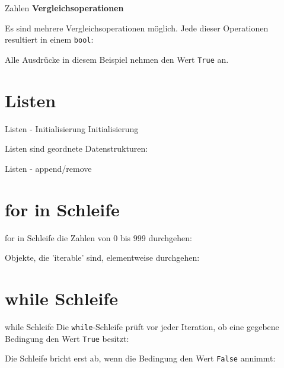 \begin{frame}{Zahlen}
	\textbf{Vergleichsoperationen}
	\linebreak
	
	Es sind mehrere Vergleichsoperationen möglich. Jede dieser Operationen resultiert in einem \alert{\texttt{bool}}:		
	
	Alle Ausdrücke in diesem Beispiel nehmen den Wert \alert{\texttt{True}} an.
\end{frame}

\section{Listen}
\begin{frame}{Listen - Initialisierung}
	Initialisierung
	
	Listen sind geordnete Datenstrukturen:
	
\end{frame}
\begin{frame}{Listen - append/remove}
	
	
	
\end{frame}

\section{for in Schleife}
\begin{frame}{for in Schleife}
	die Zahlen von 0 bis 999 durchgehen:
	
	Objekte, die 'iterable' sind, elementweise durchgehen:
	
	
\end{frame}

\section{while Schleife}
	\begin{frame}{while Schleife}
		Die \alert{\texttt{while}}-Schleife prüft vor jeder Iteration, ob eine gegebene Bedingung den Wert \alert{\texttt{True}} besitzt:
		
		Die Schleife bricht erst ab, wenn die Bedingung den Wert \alert{\texttt{False}} annimmt:
		
	\end{frame}
	
